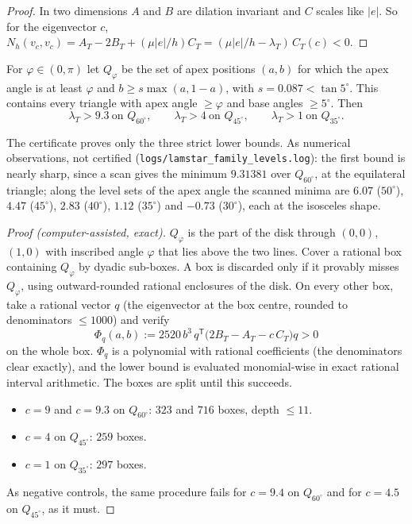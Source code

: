 \begin{proof}
In two dimensions $A$ and $B$ are dilation invariant and $C$ scales like $|e|$. So for the eigenvector $c$,
$N_h(v_c,v_c)=A_T-2B_T+(\mu|e|/h)C_T=(\mu|e|/h-\lambda_T)\,C_T(c)<0$.
\end{proof}

\begin{proposition}\label{pb:cert}
For $\varphi\in(0,\pi)$ let $Q_\varphi$ be the set of apex positions $(a,b)$ for which the apex angle is at least $\varphi$ and $b\ge
s\max(a,1-a)$, with $s=0.087<\tan5^\circ$. This contains every triangle with apex angle $\ge\varphi$ and base angles $\ge5^\circ$.
Then
\[
\lambda_T>9.3\ \text{on }Q_{60^\circ},\qquad \lambda_T>4\ \text{on }Q_{45^\circ},\qquad \lambda_T>1\ \text{on }Q_{35^\circ}.
\]
\end{proposition}

The certificate proves only the three strict lower bounds. As numerical observations, not certified (\texttt{logs/lamstar\_family\_levels.log}): the first bound is nearly sharp, since a scan gives the minimum $9.31381$ over $Q_{60^\circ}$, at the equilateral triangle; along the level sets of the apex angle the scanned minima are $6.07$ ($50^\circ$), $4.47$ ($45^\circ$), $2.83$ ($40^\circ$), $1.12$ ($35^\circ$) and $-0.73$ ($30^\circ$), each at the isosceles shape.

\begin{proof}[Proof (computer-assisted, exact)]
$Q_\varphi$ is the part of the disk through $(0,0)$, $(1,0)$ with inscribed angle $\varphi$ that lies above the two lines. Cover a
rational box containing $Q_\varphi$ by dyadic sub-boxes. A box is discarded only if it provably misses $Q_\varphi$, using
outward-rounded rational enclosures of the disk. On every other box, take a rational vector $q$ (the eigenvector at the box
centre, rounded to denominators $\le1000$) and verify
\[
\Phi_q(a,b):=2520\,b^3\,q^{\mathsf T}\bigl(2B_T-A_T-c\,C_T\bigr)q>0
\]
on the whole box. $\Phi_q$ is a polynomial with rational coefficients (the denominators clear exactly), and the lower bound is
evaluated monomial-wise in exact rational interval arithmetic. The boxes are split until this succeeds.
\begin{itemize}
\item $c=9$ and $c=9.3$ on $Q_{60^\circ}$: $323$ and $716$ boxes, depth $\le11$.
\item $c=4$ on $Q_{45^\circ}$: $259$ boxes.
\item $c=1$ on $Q_{35^\circ}$: $297$ boxes.
\end{itemize}
As negative controls, the same procedure fails for $c=9.4$ on $Q_{60^\circ}$ and for $c=4.5$ on $Q_{45^\circ}$, as it must.
\end{proof}

